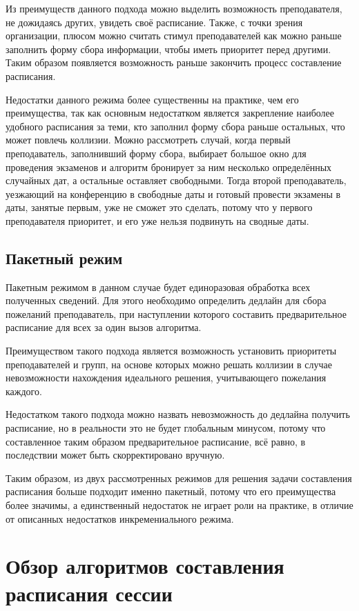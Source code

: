Из преимуществ данного подхода можно выделить возможность преподавателя, не дожидаясь других, увидеть своё расписание. Также, с точки зрения организации, плюсом можно считать стимул преподавателей как можно раньше заполнить форму сбора информации, чтобы иметь приоритет перед другими. Таким образом появляется возможность раньше закончить процесс составление расписания. 

Недостатки данного режима более существенны на практике, чем его преимущества, так как основным недостатком является закрепление наиболее удобного расписания за теми, кто заполнил форму сбора раньше остальных, что может повлечь коллизии. Можно рассмотреть случай, когда первый преподаватель, заполнивший форму сбора, выбирает большое окно для проведения экзаменов и алгоритм бронирует за ним несколько определённых случайных дат, а остальные оставляет свободными. Тогда второй преподаватель, уезжающий на конференцию в свободные даты и готовый провести экзамены в даты, занятые первым, уже не сможет это сделать, потому что у первого преподавателя приоритет, и его уже нельзя подвинуть на сводные даты.

\subsection{Пакетный режим}

Пакетным режимом в данном случае будет единоразовая обработка всех полученных сведений. Для этого необходимо определить дедлайн для сбора пожеланий преподаватель, при наступлении которого составить предварительное расписание для всех за один вызов алгоритма. 

Преимуществом такого подхода является возможность установить приоритеты преподавателей и групп, на основе которых можно решать коллизии в случае невозможности нахождения идеального решения, учитывающего пожелания каждого. 

Недостатком такого подхода можно назвать невозможность до дедлайна получить расписание, но в реальности это не будет глобальным минусом, потому что составленное таким образом предварительное расписание, всё равно, в последствии может быть скорректировано вручную. 

Таким образом, из двух рассмотренных режимов для решения задачи составления расписания больше подходит именно пакетный, потому что его преимущества более значимы, а единственный недостаток не играет роли на практике, в отличие от описанных недостатков инкремениального режима.

\section{Обзор алгоритмов составления расписания сессии} \label{ch2:sec3} 
